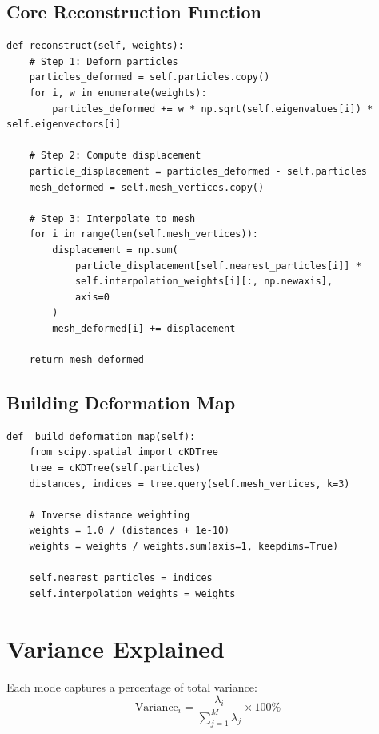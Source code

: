 \documentclass[12pt,a4paper]{article}
\begin{document}
\subsection{Core Reconstruction Function}

\begin{lstlisting}
def reconstruct(self, weights):
    # Step 1: Deform particles
    particles_deformed = self.particles.copy()
    for i, w in enumerate(weights):
        particles_deformed += w * np.sqrt(self.eigenvalues[i]) * self.eigenvectors[i]
    
    # Step 2: Compute displacement
    particle_displacement = particles_deformed - self.particles
    mesh_deformed = self.mesh_vertices.copy()
    
    # Step 3: Interpolate to mesh
    for i in range(len(self.mesh_vertices)):
        displacement = np.sum(
            particle_displacement[self.nearest_particles[i]] * 
            self.interpolation_weights[i][:, np.newaxis],
            axis=0
        )
        mesh_deformed[i] += displacement
    
    return mesh_deformed
\end{lstlisting}

\subsection{Building Deformation Map}

\begin{lstlisting}
def _build_deformation_map(self):
    from scipy.spatial import cKDTree
    tree = cKDTree(self.particles)
    distances, indices = tree.query(self.mesh_vertices, k=3)
    
    # Inverse distance weighting
    weights = 1.0 / (distances + 1e-10)
    weights = weights / weights.sum(axis=1, keepdims=True)
    
    self.nearest_particles = indices
    self.interpolation_weights = weights
\end{lstlisting}

\section{Variance Explained}

Each mode captures a percentage of total variance:
\begin{equation}
\text{Variance}_i = \frac{\lambda_i}{\sum_{j=1}^{M} \lambda_j} \times 100\%
\end{equation}
\end{document}
